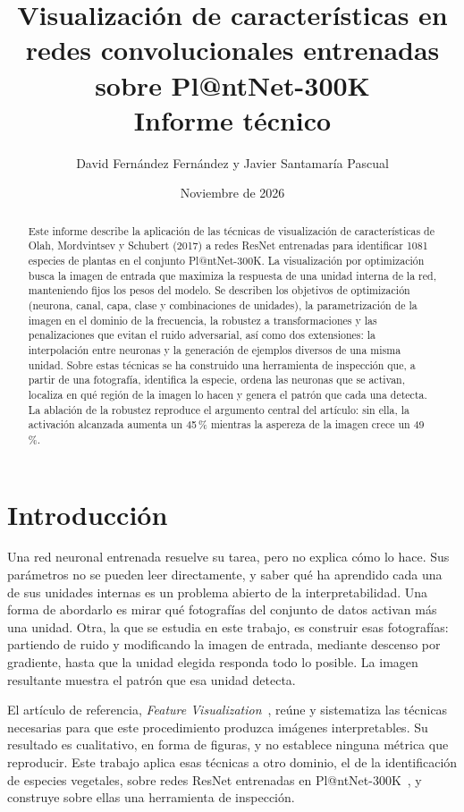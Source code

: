 \documentclass[11pt,a4paper]{article}
\title{\vspace{-1.5cm}\textbf{Visualización de características en redes
convolucionales entrenadas sobre Pl@ntNet-300K}\\[3pt]
\large Informe técnico}
\author{David Fernández Fernández y Javier Santamaría Pascual}
\date{Noviembre de 2026}
\begin{document}
\maketitle

\begin{abstract}
\noindent
Este informe describe la aplicación de las técnicas de visualización de
características de Olah, Mordvintsev y Schubert (2017) a redes ResNet
entrenadas para identificar 1081 especies de plantas en el conjunto
Pl@ntNet-300K. La visualización por optimización busca la imagen de entrada
que maximiza la respuesta de una unidad interna de la red, manteniendo
fijos los pesos del modelo. Se describen los objetivos de optimización
(neurona, canal, capa, clase y combinaciones de unidades), la
parametrización de la imagen en el dominio de la frecuencia, la robustez a
transformaciones y las penalizaciones que evitan el ruido adversarial, así
como dos extensiones: la interpolación entre neuronas y la generación de
ejemplos diversos de una misma unidad. Sobre estas técnicas se ha
construido una herramienta de inspección que, a partir de una fotografía,
identifica la especie, ordena las neuronas que se activan, localiza en qué
región de la imagen lo hacen y genera el patrón que cada una detecta. La
ablación de la robustez reproduce el argumento central del artículo:
sin ella, la activación alcanzada aumenta un 45\,\% mientras la aspereza de
la imagen crece un 49\,\%.
\end{abstract}

\section{Introducción}

Una red neuronal entrenada resuelve su tarea, pero no explica cómo lo hace.
Sus parámetros no se pueden leer directamente, y saber qué ha aprendido cada
una de sus unidades internas es un problema abierto de la
interpretabilidad. Una forma de abordarlo es mirar qué fotografías del
conjunto de datos activan más una unidad. Otra, la que se estudia en este
trabajo, es construir esas fotografías: partiendo de ruido y modificando la
imagen de entrada, mediante descenso por gradiente, hasta que la unidad
elegida responda todo lo posible. La imagen resultante muestra el patrón que
esa unidad detecta.

El artículo de referencia, \emph{Feature Visualization}~\cite{olah2017},
reúne y sistematiza las técnicas necesarias para que este procedimiento
produzca imágenes interpretables. Su resultado es cualitativo, en forma de
figuras, y no establece ninguna métrica que reproducir. Este trabajo aplica
esas técnicas a otro dominio, el de la identificación de especies vegetales,
sobre redes ResNet entrenadas en Pl@ntNet-300K~\cite{plantnet}, y construye
sobre ellas una herramienta de inspección.
\end{document}
